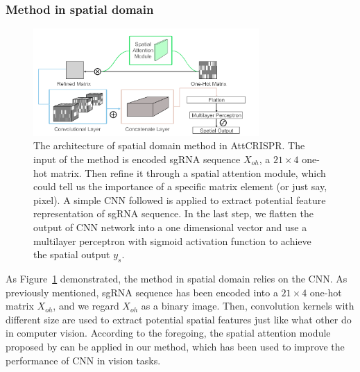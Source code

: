 \documentclass{bioinfo}
\begin{document}
\subsubsection{Method in spatial domain}

\begin{figure}[!tpb]%
    \centerline{\includegraphics[width=86mm]{CNNv2.png}}
    \caption{The architecture of spatial domain method in AttCRISPR. 
    The input of the method is encoded sgRNA sequence $X_{oh}$, a $21\times 4$ one-hot matrix. 
    Then refine it through a spatial attention module, which could tell us the importance of a specific matrix element (or just say, pixel).
    A simple CNN followed is applied to extract potential feature representation of sgRNA sequence.
    In the last step, we flatten the output of CNN network into a one dimensional vector and 
    use a multilayer perceptron with sigmoid activation function to achieve the spatial output $y_s$.}\label{fig:CNN}
\end{figure}

As Figure~\ref{fig:CNN} demonstrated, the method in spatial domain relies on the CNN. 
As previously mentioned, sgRNA sequence has been encoded into a $21\times 4$ one-hot matrix $X_{oh}$, and we regard $X_{oh}$ as a binary image. 
Then, convolution kernels with different size are used to extract potential spatial features just like what other do in computer vision. 
According to the foregoing, the spatial attention module proposed by \citeauthor{woo2018cbam:} can be applied in our method, 
which has been used to improve the performance of CNN in vision tasks.
\end{document}
